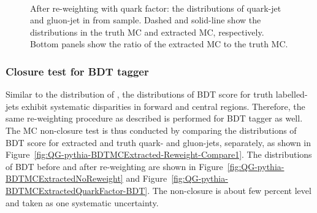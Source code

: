 \begin{figure}[htb]
	 \\
	\caption[]{
		After re-weighting with quark factor: the {\ntrk} distributions of quark-jet   
		and gluon-jet in  
		 from {} sample. %
		Dashed and solid-line show the {\ntrk} distributions in the truth MC and extracted MC, respectively.
		Bottom panels show the ratio of the extracted MC to the truth MC. %
		\label{fig:QG-pythia-NtrkMCExtractedQuarkFactor-Ntrk}
	}
\end{figure}

\FloatBarrier

\subsubsection{Closure test for BDT tagger}
Similar to the distribution of {\ntrk}, the distributions of BDT score for truth labelled-jets exhibit systematic disparities in forward and central regions. Therefore, the same re-weighting procedure as described is performed for BDT tagger as well. The MC non-closure test is thus conducted by comparing the distributions of BDT score for extracted and truth quark- and gluon-jets, separately, as shown in Figure~\ref{fig:QG-pythia-BDTMCExtracted-Reweight-Compare1}. The distributions of BDT before and after re-weighting are shown in Figure~\ref{fig:QG-pythia-BDTMCExtractedNoReweight} and Figure~\ref{fig:QG-pythia-BDTMCExtractedQuarkFactor-BDT}. The non-closure is about few percent level and taken as one systematic uncertainty.

